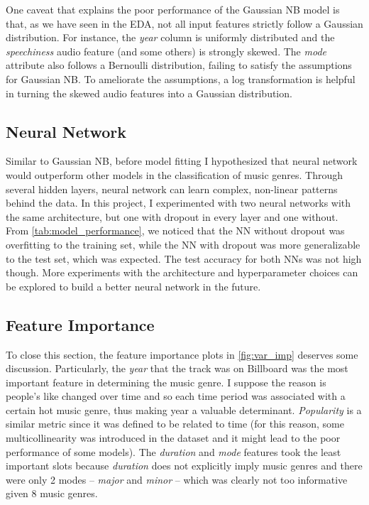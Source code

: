\documentclass{article}
\begin{document}
One caveat that explains the poor performance of the Gaussian NB model is that, as we have seen in the EDA, not all input features strictly follow a Gaussian distribution. For instance, the \textit{year} column is uniformly distributed and the \textit{speechiness} audio feature (and some others) is strongly skewed. The \textit{mode} attribute also follows a Bernoulli distribution, failing to satisfy the assumptions for Gaussian NB. To ameliorate the assumptions, a log transformation is helpful in turning the skewed audio features into a Gaussian distribution.

\subsection{Neural Network}

Similar to Gaussian NB, before model fitting I hypothesized that neural network would outperform other models in the classification of music genres. Through several hidden layers, neural network can learn complex, non-linear patterns behind the data. In this project, I experimented with two neural networks with the same architecture, but one with dropout in every layer and one without. From \autoref{tab:model_performance}, we noticed that the NN without dropout was overfitting to the training set, while the NN with dropout was more generalizable to the test set, which was expected. The test accuracy for both NNs was not high though. More experiments with the architecture and hyperparameter choices can be explored to build a better neural network in the future.

\subsection{Feature Importance}

To close this section, the feature importance plots in \autoref{fig:var_imp} deserves some discussion. Particularly, the \textit{year} that the track was on Billboard was the most important feature in determining the music genre. I suppose the reason is people's like changed over time and so each time period was associated with a certain hot music genre, thus making year a valuable determinant. \textit{Popularity} is a similar metric since it was defined to be related to time (for this reason, some multicollinearity was introduced in the dataset and it might lead to the poor performance of some models). The \textit{duration} and \textit{mode} features took the least important slots because \textit{duration} does not explicitly imply music genres and there were only 2 modes -- \textit{major} and \textit{minor} -- which was clearly not too informative given 8 music genres.
\end{document}
